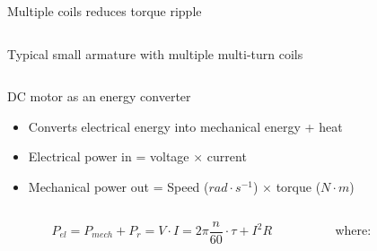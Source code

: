 \documentclass[compress]{beamer}
\begin{document}
\begin{frame}{Multiple coils reduces torque ripple}
\begin{columns}
\begin{column}{0.5\linewidth}
\begin{center}
                Typical small armature with multiple multi-turn coils
            \end{center}
        \end{column}
    \end{columns}


\end{frame}

\begin{frame}{DC motor as an energy converter}


\begin{itemize}

\item Converts electrical energy into mechanical energy + heat
\item Electrical power in = voltage $\times$ current
\item Mechanical power out = Speed ($rad \cdot s^{-1}$) $\times$ torque ($N\cdot m$)
\end{itemize}

    \begin{columns}
        \begin{column}{0.7\linewidth}
    \begin{center}

    \[
        P_{el} = P_{mech} + P_{r} = V\cdot I = 2\pi\frac{n}{60}\cdot \tau + I^2 R
    \]
    \end{center}

        \end{column}
        \begin{column}{0.3\linewidth}
    \footnotesize
    where:


\end{column}
\end{columns}
\end{frame}
\end{document}
